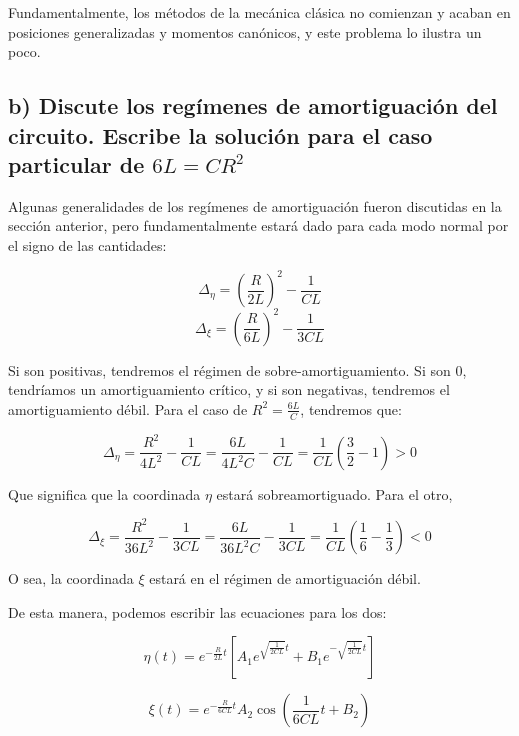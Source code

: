 \documentclass[a4paper,12pt]{article}
\begin{document}
Fundamentalmente, los métodos de la mecánica clásica no comienzan y acaban en posiciones generalizadas y momentos canónicos, y este problema lo ilustra un poco.

\subsection*{b) Discute los regímenes de amortiguación del circuito. Escribe la solución para el caso particular de $6L = CR^2$}

Algunas generalidades de los regímenes de amortiguación fueron discutidas en la sección anterior, pero fundamentalmente estará dado para cada modo normal por el signo de las cantidades:

$$\Delta_\eta = \left(\frac{R}{2L}\right)^2 - \frac{1}{CL}$$
$$\Delta_\xi = \left(\frac{R}{6L}\right)^2 - \frac{1}{3CL}$$

Si son positivas, tendremos el régimen de sobre-amortiguamiento. Si son 0, tendríamos un amortiguamiento crítico, y si son negativas, tendremos el amortiguamiento débil. Para el caso de $R^2 =\frac{6 L }{C} $, tendremos que:

\begin{equation}
  \Delta_\eta = \frac{R^2}{4 L^2} - \frac{1}{CL} = \frac{6L}{4 L^2 C} - \frac{1}{CL} = \frac{1}{CL} \left(\frac{3}{2} - 1\right) > 0
\end{equation}

Que significa que la coordinada $\eta$ estará sobreamortiguado. Para el otro,

\begin{equation}
  \Delta_\xi = \frac{R^2}{36L^2} - \frac{1}{3CL} = \frac{6 L}{36 L^2 C} - \frac{1}{3CL} = \frac{1}{CL} \left(\frac{1}{6} - \frac{1}{3}\right) < 0
\end{equation}

O sea, la coordinada $\xi$ estará en el régimen de amortiguación débil.

De esta manera, podemos escribir las ecuaciones para los dos:

\begin{equation}
\eta (t) =   e^{-\frac{R}{2L} t}  \left[A_1 e^{\sqrt{\frac{1}{2CL}} t} + B_1 e^{-\sqrt{\frac{1}{2CL}} t}\right]
\end{equation}


\begin{equation}
\xi(t) = e^{-\frac{R}{6CL} t}  A_2\cos{\left(\frac{1}{6CL} t + B_2\right)} 
\end{equation}
\end{document}
